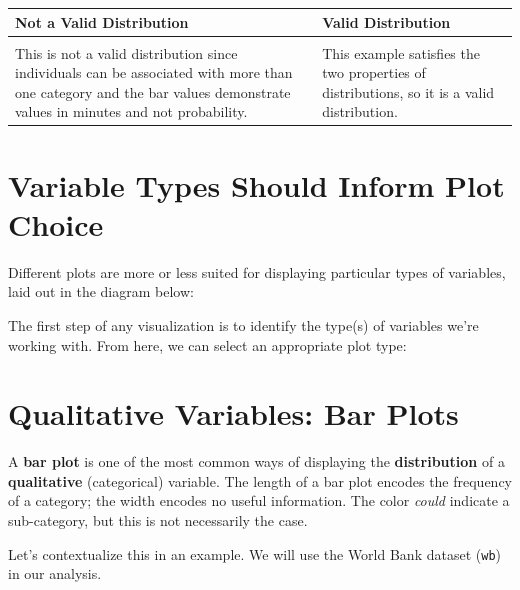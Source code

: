 \documentclass[
  letterpaper,
  DIV=11,
  numbers=noendperiod]{scrreprt}
\begin{document}
\begin{longtable}[]{@{}
  >{\raggedright\arraybackslash}p{}
  >{\raggedright\arraybackslash}p{}@{}}
\toprule\noalign{}
\begin{minipage}[b]{\linewidth}\raggedright
Not a Valid Distribution
\end{minipage} & \begin{minipage}[b]{\linewidth}\raggedright
Valid Distribution
\end{minipage} \\
\midrule\noalign{}
\endhead
\bottomrule\noalign{}
\endlastfoot
& \\
This is not a valid distribution since individuals can be associated
with more than one category and the bar values demonstrate values in
minutes and not probability. & This example satisfies the two properties
of distributions, so it is a valid distribution. \\
\end{longtable}

\section{Variable Types Should Inform Plot
Choice}\label{variable-types-should-inform-plot-choice}

Different plots are more or less suited for displaying particular types
of variables, laid out in the diagram below:

The first step of any visualization is to identify the type(s) of
variables we're working with. From here, we can select an appropriate
plot type:

\section{Qualitative Variables: Bar
Plots}\label{qualitative-variables-bar-plots}

A \textbf{bar plot} is one of the most common ways of displaying the
\textbf{distribution} of a \textbf{qualitative} (categorical) variable.
The length of a bar plot encodes the frequency of a category; the width
encodes no useful information. The color \emph{could} indicate a
sub-category, but this is not necessarily the case.

Let's contextualize this in an example. We will use the World Bank
dataset (\texttt{wb}) in our analysis.
\end{document}
